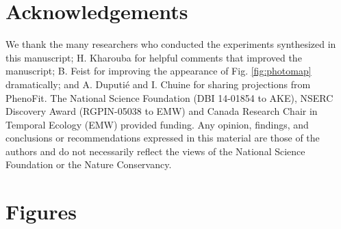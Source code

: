 \documentclass{article}
\begin{document}
\section*{Acknowledgements}
We thank the many researchers who conducted the experiments synthesized in this manuscript; H. Kharouba for helpful comments that improved the manuscript; B. Feist for improving the appearance of Fig. \ref{fig:photomap} dramatically; and A. Duputi\'e and I. Chuine for sharing projections from PhenoFit. The National Science Foundation (DBI 14-01854 to AKE), NSERC Discovery Award (RGPIN-05038 to EMW) and Canada Research Chair in Temporal Ecology (EMW) provided funding. Any opinion, findings, and conclusions or recommendations expressed in this material are those of the authors and do not necessarily reflect the views of the National Science Foundation or the Nature Conservancy.

\clearpage


\section* {Figures}
\end{document}
